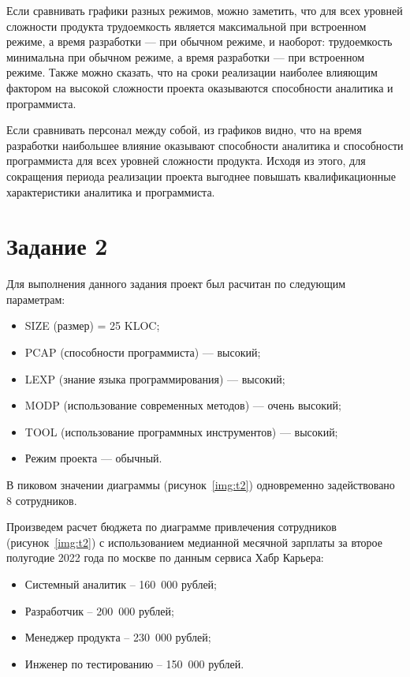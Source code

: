 Если сравнивать графики разных режимов, можно заметить, что для всех уровней сложности продукта трудоемкость является максимальной 
при встроенном режиме, а время разработки --- при обычном режиме, и наоборот: трудоемкость минимальна при обычном режиме, а 
время разработки --- при встроенном режиме. Также можно сказать,
что на сроки реализации наиболее влияющим фактором на высокой сложности проекта оказываются способности аналитика и программиста. 

Если сравнивать персонал между собой, 
из графиков видно, что на время разработки наибольшее влияние оказывают способности аналитика и способности программиста для всех уровней сложности продукта. Исходя из этого, для сокращения периода реализации проекта выгоднее повышать квалификационные характеристики аналитика и программиста.

\section{Задание 2}

Для выполнения данного задания проект был расчитан по следующим параметрам:
\begin{itemize}[label = ---]
	\item SIZE (размер) = 25 KLOC;
	\item PCAP (способности программиста) --- высокий;
	\item LEXP (знание языка программирования) --- высокий;
	\item MODP (использование современных методов) --- очень высокий;
	\item TOOL (использование программных инструментов) --- высокий;
	\item Режим проекта --- обычный.
\end{itemize}



В пиковом значении диаграммы (рисунок~\ref{img:t2}) одновременно задействовано 8 сотрудников.

\newpage
Произведем расчет бюджета по диаграмме привлечения сотрудников (рисунок~\ref{img:t2}) с использованием медианной месячной
зарплаты за второе полугодие 2022 года по москве по данным сервиса Хабр
Карьера:
\begin{itemize}[label = ---]
	\item Системный аналитик – 160~000 рублей;
	\item Разработчик – 200~000 рублей;
	\item Менеджер продукта – 230~000 рублей;
	\item Инженер по тестированию – 150~000 рублей.
\end{itemize}

